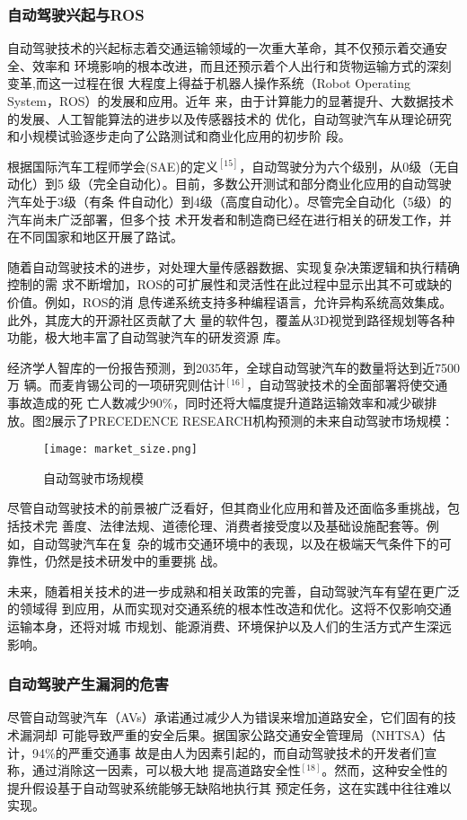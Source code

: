 \subsubsection{自动驾驶兴起与ROS}
自动驾驶技术的兴起标志着交通运输领域的一次重大革命，其不仅预示着交通安全、效率和
环境影响的根本改进，而且还预示着个人出行和货物运输方式的深刻变革,而这一过程在很
大程度上得益于机器人操作系统（Robot Operating System，ROS）的发展和应用。近年
来，由于计算能力的显著提升、大数据技术的发展、人工智能算法的进步以及传感器技术的
优化，自动驾驶汽车从理论研究和小规模试验逐步走向了公路测试和商业化应用的初步阶
段。

根据国际汽车工程师学会(SAE)的定义$^{[15]}$，自动驾驶分为六个级别，从0级（无自动化）到5
级（完全自动化）。目前，多数公开测试和部分商业化应用的自动驾驶汽车处于3级（有条
件自动化）到4级（高度自动化）。尽管完全自动化（5级）的汽车尚未广泛部署，但多个技
术开发者和制造商已经在进行相关的研发工作，并在不同国家和地区开展了路试。

随着自动驾驶技术的进步，对处理大量传感器数据、实现复杂决策逻辑和执行精确控制的需
求不断增加，ROS的可扩展性和灵活性在此过程中显示出其不可或缺的价值。例如，ROS的消
息传递系统支持多种编程语言，允许异构系统高效集成。此外，其庞大的开源社区贡献了大
量的软件包，覆盖从3D视觉到路径规划等各种功能，极大地丰富了自动驾驶汽车的研发资源
库。

经济学人智库的一份报告预测，到2035年，全球自动驾驶汽车的数量将达到近7500万
辆。而麦肯锡公司的一项研究则估计$^{[16]}$，自动驾驶技术的全面部署将使交通事故造成的死
亡人数减少90\%，同时还将大幅度提升道路运输效率和减少碳排放。图2展示了PRECEDENCE
RESEARCH机构预测的未来自动驾驶市场规模：

\begin{figure}[H]
  \centering
  \texttt{[image: market\_size.png]}
  \caption{自动驾驶市场规模}
  \label{fig:my_label}
\end{figure}

尽管自动驾驶技术的前景被广泛看好，但其商业化应用和普及还面临多重挑战，包括技术完
善度、法律法规、道德伦理、消费者接受度以及基础设施配套等。例如，自动驾驶汽车在复
杂的城市交通环境中的表现，以及在极端天气条件下的可靠性，仍然是技术研发中的重要挑
战。

未来，随着相关技术的进一步成熟和相关政策的完善，自动驾驶汽车有望在更广泛的领域得
到应用，从而实现对交通系统的根本性改造和优化。这将不仅影响交通运输本身，还将对城
市规划、能源消费、环境保护以及人们的生活方式产生深远影响。

\subsubsection{自动驾驶产生漏洞的危害}
尽管自动驾驶汽车（AVs）承诺通过减少人为错误来增加道路安全，它们固有的技术漏洞却
可能导致严重的安全后果。据国家公路交通安全管理局（NHTSA）估计，94\%的严重交通事
故是由人为因素引起的，而自动驾驶技术的开发者们宣称，通过消除这一因素，可以极大地
提高道路安全性$^{[18]}$。然而，这种安全性的提升假设基于自动驾驶系统能够无缺陷地执行其
预定任务，这在实践中往往难以实现。

